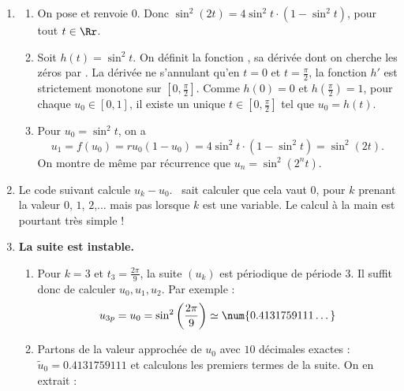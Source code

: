 \documentclass[class=report,crop=false]{standalone}
\begin{document}
\begin{enumerate}
  \item 
  \begin{enumerate}
    \item On pose 
    et  renvoie $0$. Donc 
    $\sin^2(2t) = 4 \sin^2 t \cdot (1-\sin^2 t)$, pour tout $t\in\Rr$.
    
    \item Soit $h(t) = \sin^2 t$. On définit la fonction , sa dérivée 
     dont on cherche les zéros 
    par . La dérivée ne s'annulant qu'en $t=0$ et
    $t=\frac\pi2$, la fonction $h'$ est strictement monotone sur $[0,\frac\pi2]$.
    Comme $h(0)=0$ et $h(\frac\pi2)=1$, pour chaque $u_0 \in [0,1]$, 
    il existe un unique $t \in [0,\frac\pi2]$ tel que
    $u_0 = h(t)$. 
    \item Pour $u_0 = \sin^2 t$, on a 
    $$u_{1} = f(u_0) = ru_0(1-u_0) = 4\sin^2 t \cdot (1-\sin^2 t) =  \sin^2(2 t).$$
    On montre de même par récurrence que $u_n =   \sin^2(2^n t)$.
  \end{enumerate}
  
  \item Le code suivant calcule $u_k-u_0$.
  \Sage\ sait calculer que cela vaut $0$, pour $k$ prenant la valeur $0$, $1$, $2$,...
  mais pas lorsque $k$ est une variable. Le calcul à la main est pourtant très simple !
  
 
  \item \textbf{La suite est instable.}
  \begin{enumerate}
    \item  Pour $k=3$ et $t_3 = \frac{2\pi}{9}$, la suite $(u_k)$ est périodique de période $3$.
    Il suffit donc de calculer $u_0,u_1,u_2$.
    Par exemple :
    $$u_{3p} = u_0 = \sin^2\left( \frac{2\pi}{9}\right) \simeq \num{0.4131759111\dots}$$
    
    \item Partons de la valeur approchée de $u_0$ avec $10$ décimales exactes :    
    $\tilde{u}_0 = \num{0.4131759111}$ et calculons les premiers termes de la suite. On en extrait :


\end{enumerate}
\end{enumerate}
\end{document}
